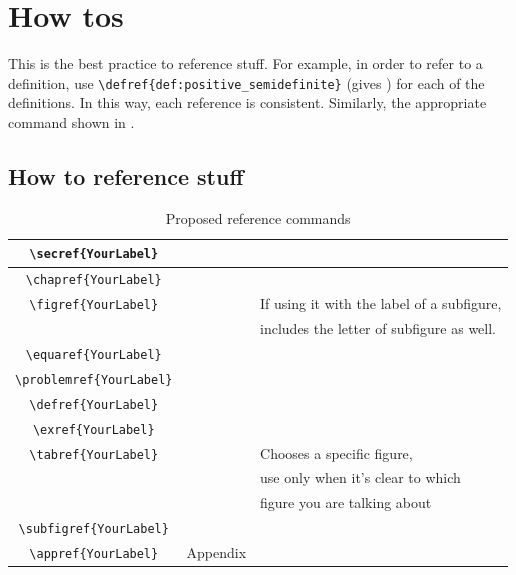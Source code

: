 \chapter{How tos}\label{chap:how_tos}


This is the best practice to reference stuff. For example, in order to refer to a definition, use \verb|\defref{def:positive_semidefinite}| (gives ) for each of the definitions. In this way, each reference is consistent. Similarly, the appropriate command shown in .



\section{How to reference stuff}\label{sec:general_definitions}


\begin{table}[h]
	\centering
	\begin{tabular}{|c|c|l|}
		\hline
		\texttt{\textbackslash secref\{YourLabel\}} & \secref{sec:general_definitions} &  \\ \hline
		\texttt{\textbackslash chapref\{YourLabel\}} & \chapref{chap:how_tos} &  \\ \hline
		\texttt{\textbackslash figref\{YourLabel\}} & \figref{fig:nyc_rn} &If using it with the label of a subfigure, \\&&includes the letter of subfigure as well.\\ \hline
		\texttt{\textbackslash equaref\{YourLabel\}} & \equaref{eq:equation_test} &  \\ \hline
		\texttt{\textbackslash problemref\{YourLabel\}} & \problemref{prob:example} &  \\ \hline
		\texttt{\textbackslash defref\{YourLabel\}} & {def:positive_semidefinite} &  \\ \hline
		\texttt{\textbackslash exref\{YourLabel\}} & \exref{ex:example} &  \\ \hline
		\texttt{\textbackslash tabref\{YourLabel\}} &  \tabref{tab:ref_commands} & Chooses a specific figure, \\&&use only when it's clear to which \\&&figure you are talking about \\ \hline
		\texttt{\textbackslash subfigref\{YourLabel\}} & \subfigref{fig:nyc_simplified_roads} &  \\ \hline
		\texttt{\textbackslash appref\{YourLabel\}} & Appendix &  \\ \hline
	\end{tabular}
	\caption{Proposed reference commands}\label{tab:ref_commands}
\end{table}



